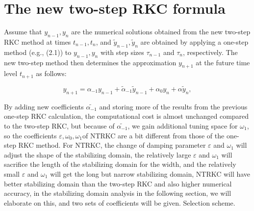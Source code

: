 \documentclass[review]{elsarticle}
\begin{document}
\section{The new two-step RKC formula}

Assume that $y_{n-1},y_n$ are the numerical solutions obtained from the new two-step RKC method at times $t_{n-1},t_n$, and $\tilde{y}_{n-1},\tilde{y}_n$ are obtained by applying a one-step method (e.g., (2.1)) to $y_{n-1},y_n$ with step sizes $\tau_{n-1}$ and $\tau_n$, respectively.
The new two-step method then determines the approximation $y_{n+1}$ at the future time level $t_{n+1}$ as follows:

$$
y_{n+1} = \alpha_{-1}y_{n-1} + \tilde{\alpha}_{-1}\tilde{y}_{n-1} + \alpha_0y_n + \alpha\tilde{y}_n,
$$

By adding new coefficients $\tilde{\alpha_{-1}}$ and storing more of the results from the previous one-step RKC calculation, the computational cost is almost unchanged compared to the two-step RKC, 
but because of $\tilde{\alpha_{-1}}$, we gain additional tuning space for $\omega_{1}$, so the coefficients $\varepsilon,\omega_{0},\omega_{1} $of NTRKC are a bit different from those of the one-step RKC method. 
For NTRKC, the change of damping parameter $\varepsilon$ and $\omega_{1}$ will adjust the shape of the stabilizing domain, the relatively large $\varepsilon$ and $\omega_{1}$ will sacrifice the length of the stabilizing domain for the width,
 and the relatively small $\varepsilon$ and $\omega_{1}$ will get the long but narrow stabilizing domain, NTRKC will have better stabilizing domain than the two-step RKC and also higher numerical accuracy, 
 in the stabilizing domain analysis in the following section, we will elaborate on this, and two sets of coefficients will be given. Selection scheme.
\end{document}
